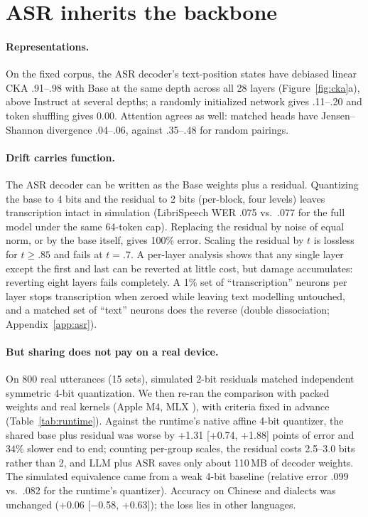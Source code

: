 \documentclass[11pt]{article}
\begin{document}
\section{ASR inherits the backbone}
\label{sec:asr}

\paragraph{Representations.} On the fixed corpus, the ASR decoder's text-position states have debiased linear CKA .91--.98 with Base at the same depth across all 28 layers (Figure~\ref{fig:cka}a), above Instruct at several depths; a randomly initialized network gives .11--.20 and token shuffling gives 0.00. Attention agrees as well: matched heads have Jensen--Shannon divergence .04--.06, against .35--.48 for random pairings.

\paragraph{Drift carries function.} The ASR decoder can be written as the Base weights plus a residual. Quantizing the base to 4 bits and the residual to 2 bits (per-block, four levels) leaves transcription intact in simulation (LibriSpeech WER .075 vs.\ .077 for the full model under the same 64-token cap). Replacing the residual by noise of equal norm, or by the base itself, gives 100\% error. Scaling the residual by $t$ is lossless for $t\geq .85$ and fails at $t=.7$. A per-layer analysis shows that any single layer except the first and last can be reverted at little cost, but damage accumulates: reverting eight layers fails completely. A 1\% set of ``transcription'' neurons per layer stops transcription when zeroed while leaving text modelling untouched, and a matched set of ``text'' neurons does the reverse (double dissociation; Appendix~\ref{app:asr}).

\paragraph{But sharing does not pay on a real device.} On 800 real utterances (15 sets), simulated 2-bit residuals matched independent symmetric 4-bit quantization. We then re-ran the comparison with packed weights and real kernels (Apple M4, MLX \citep{mlx}), with criteria fixed in advance (Table~\ref{tab:runtime}). Against the runtime's native affine 4-bit quantizer, the shared base plus residual was worse by +1.31 [+0.74, +1.88] points of error and 34\% slower end to end; counting per-group scales, the residual costs 2.5--3.0 bits rather than 2, and LLM plus ASR saves only about 110\,MB of decoder weights. The simulated equivalence came from a weak 4-bit baseline (relative error .099 vs.\ .082 for the runtime's quantizer). Accuracy on Chinese and dialects was unchanged (+0.06 [$-$0.58, +0.63]); the loss lies in other languages.
\end{document}
